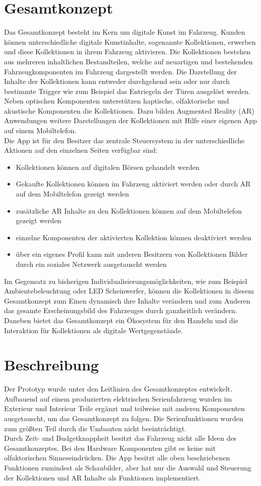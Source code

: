 \section{Gesamtkonzept}
Das Gesamtkonzept besteht im Kern um digitale Kunst im Fahrzeug. Kunden können unterschiedliche digitale Kunstinhalte, sogenannte Kollektionen, erwerben und diese Kollektionen in ihrem Fahrzeug aktivieren. Die Kollektionen bestehen aus mehreren inhaltlichen Bestandteilen, welche auf neuartigen und bestehenden Fahrzeugkomponenten im Fahrzeug dargestellt werden. Die Darstellung der Inhalte der Kollektionen kann entweder durchgehend sein oder nur durch bestimmte Trigger wie zum Beispiel das Entriegeln der Türen ausgelöst werden.
Neben optischen Komponenten unterstützen haptische, olfaktorische und akustische Komponenten die Kollektionen. Dazu bilden Augmented Reality (AR) Anwendungen weitere Darstellungen der Kollektionen mit Hilfe einer eigenen App auf einem Mobiltelefon.\\
Die App ist für den Besitzer das zentrale Steuersystem in der unterschiedliche Aktionen auf den einzelnen Seiten verfügbar sind:
\begin{itemize}
	\item Kollektionen können auf digitalen Börsen gehandelt werden
	\item Gekaufte Kollektionen können im Fahrzeug aktiviert werden oder durch AR auf dem Mobiltelefon gezeigt werden
	\item zusätzliche AR Inhalte zu den Kollektionen können auf dem Mobiltelefon gezeigt werden
	\item einzelne Komponenten der aktivierten Kollektion können deaktiviert werden
	\item über ein eigenes Profil kann mit anderen Besitzern von Kollektionen Bilder durch ein soziales Netzwerk ausgetauscht werden
\end{itemize}
Im Gegensatz zu bisherigen Individualisierungsmöglichkeiten, wie zum Beispiel Ambientebeleuchtung oder LED Scheinwerfer, können die Kollektionen in diesem Gesamtkonzept zum Einen dynamisch ihre Inhalte verändern und zum Anderen das gesamte Erscheinungsbild des Fahrzeuges durch ganzheitlich verändern. Daneben bietet das Gesamtkonzept ein Ökosystem für den Handeln und die Interaktion für Kollektionen als digitale Wertgegenstände.
\section{Beschreibung}
Der Prototyp wurde unter den Leitlinien des Gesamtkonzeptes entwickelt. Aufbauend auf einem produzierten elektrischen Serienfahrzeug wurden im Exterieur und Interieur Teile ergänzt und teilweise mit anderen Komponenten ausgetauscht, um das Gesamtkonzept zu folgen. Die Serienfunktionen wurden zum größten Teil durch die Umbauten nicht beeinträchtigt.\\
Durch Zeit- und Budgetknappheit besitzt das Fahrzeug nicht alle Ideen des Gesamtkonzeptes. Bei den Hardware Komponenten gibt es keine mit olfaktorischen Sinneseindrücken. Die App besitzt alle oben beschriebenen Funktionen zumindest als Schaubilder, aber hat nur die Auswahl und Steuerung der Kollektionen und AR Inhalte als Funktionen implementiert.
